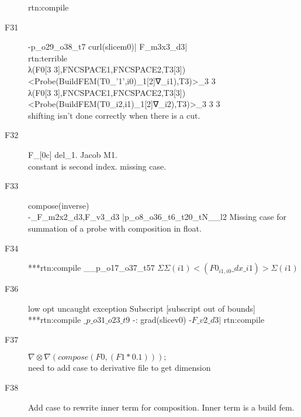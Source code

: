 \begin{description}
	rtn:compile 
	\item[F31]
	-p\_o29\_o38\_t7 curl(slicem0)| F\_m3x3\_d3| \\
	rtn:terrible\\
λ(F0[3 3],FNCSPACE1,FNCSPACE2,T3[3])<Probe(BuildFEM(T0\_{'1',i0})\_1[2]∇\_{i1}),T3)>\_{3 3}\\
λ(F0[3 3],FNCSPACE1,FNCSPACE2,T3[3])<Probe(BuildFEM(T0\_{i2,i1})\_1[2]∇\_{i2}),T3)>\_{3 3 3}\\

shifting isn’t done correctly when there is a cut.
\item[F32]
F\_[0c] del\_1. Jacob M1.\\
constant is second index. missing case.\\
\item[F33]
compose(inverse)\\
-\_F\_m2x2\_d3,F\_v3\_d3 |p\_o8\_o36\_t6\_t20\_tN\_\_l2
Missing case for summation of a probe with composition in float. \\
\item[F34]
***rtn:compile \_\_p\_o17\_o37\_t57
$ΣΣ(i1)<(F0_{i1,i0}\_dx\_{i1})>Σ(i1)$
\item[F36]
 low opt uncaught exception Subscript [subscript out of bounds]
***rtn:compile $\_p\_o31\_o23\_t9$
	 -: grad(slicev0)
	-$F\_v2\_d3 |$
		rtn:compile 
\item [F37]
 $\nabla \otimes \nabla (compose(F0,(F1*0.1)));$\\
 need to add case to derivative file to get dimension\\
 \item [F38]
 Add case to rewrite inner term for composition. Inner term is a build fem.
\end{description}